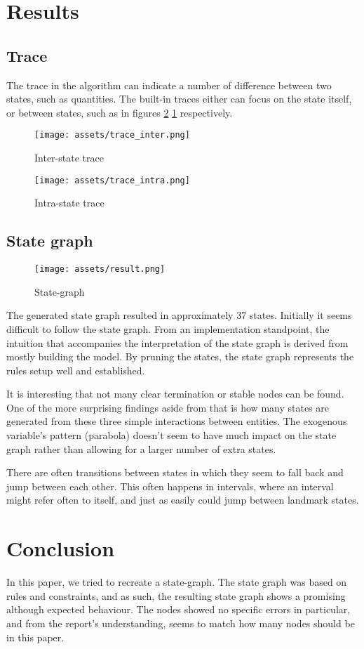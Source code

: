 \section{Results}
\subsection{Trace}
The trace in the algorithm can indicate a number of difference between two
states, such as quantities. The built-in traces either can focus on the state
itself, or between states, such as in figures \ref{fig:trace_intra.png}
\ref{fig:trace_inter.png} respectively.

\begin{figure}
    \texttt{[image: assets/trace\_inter.png]}
    \caption{Inter-state trace}
    \label{fig:trace_inter.png}
\end{figure}

\begin{figure}
    \texttt{[image: assets/trace\_intra.png]}
    \caption{Intra-state trace}
    \label{fig:trace_intra.png}
\end{figure}

\subsection{State graph}
\begin{figure*}
    \texttt{[image: assets/result.png]}
    \caption{State-graph}
    \label{fig:state_graph.png}
\end{figure*}

The generated state graph resulted in approximately 37 states. Initially it
seems difficult to follow the state graph. From an implementation standpoint,
the intuition that accompanies the interpretation of the state graph is derived
from mostly building the model. By pruning the states, the state graph
represents the rules setup well and established.

It is interesting that not many clear termination or stable nodes can be found.
One of the more surprising findings aside from that is how many states are
generated from these three simple interactions between entities. The exogenous
variable's pattern (parabola) doesn't seem to have much impact on the state
graph rather than allowing for a larger number of extra states. 

There are often transitions between states in which they seem to fall back and
jump between each other. This often happens in intervals, where an interval
might refer often to itself, and just as easily could jump between landmark
states.

\section{Conclusion}
In this paper, we tried to recreate a state-graph. The state graph was based on
rules and constraints, and as such, the resulting state graph shows a promising 
although expected behaviour. The nodes showed no specific errors in particular, 
and from the report's understanding, seems to match how many nodes should be in 
this paper.